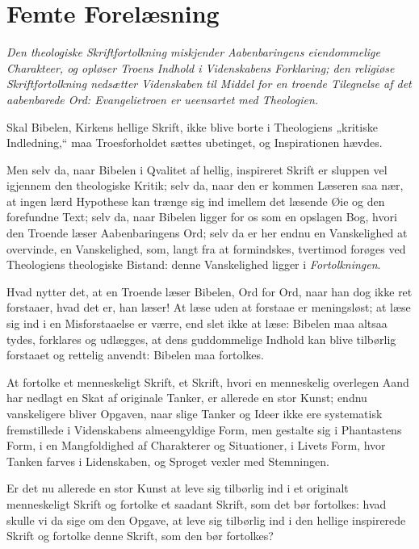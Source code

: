\documentclass[12pt,a4paper]{book}
\newcommand{\opage}[1]{\marginnote{\footnotesize\textit{[#1]}}}
\begin{document}
\chapter*{Femte Forelæsning}
\label{ch:forel5}

\begin{center}\itshape
Den theologiske Skriftfortolkning miskjender Aabenbaringens eiendommelige
Charakteer, og opløser Troens Indhold i Videnskabens Forklaring; den
religiøse Skriftfortolkning nedsætter Videnskaben til Middel for en
troende Tilegnelse af det aabenbarede Ord: Evangelietroen er ueensartet
med Theologien.
\end{center}

\opage{52} Skal Bibelen, Kirkens hellige Skrift, ikke blive borte i Theologiens
„kritiske Indledning,“ maa Troesforholdet sættes ubetinget, og
Inspirationen hævdes.

Men selv da, naar Bibelen i Qvalitet af hellig, inspireret Skrift er
sluppen vel igjennem den theologiske Kritik; selv da, naar den er kommen
Læseren saa nær, at ingen lærd Hypothese kan trænge sig ind imellem det
læsende Øie og den forefundne Text; selv da, naar Bibelen ligger for os
som en opslagen Bog, hvori den Troende læser Aabenbaringens Ord; selv da
er her endnu en Vanskelighed at overvinde, en Vanskelighed, som, langt
fra at formindskes, tvertimod forøges ved Theologiens theologiske
Bistand: denne Vanskelighed ligger i \emph{Fortolkningen}.

Hvad nytter det, at en Troende læser Bibelen, Ord for Ord, naar han dog
ikke ret forstaaer, hvad det er, han læser! At læse uden at forstaae er
meningsløst; at læse sig ind i en Misforstaaelse er værre, end slet ikke
at læse: Bibelen maa altsaa tydes, forklares og udlægges, at dens
guddommelige Indhold
\opage{53} kan blive tilbørlig forstaaet og rettelig anvendt: Bibelen maa fortolkes.

At fortolke et menneskeligt Skrift, et Skrift, hvori en menneskelig
overlegen Aand har nedlagt en Skat af originale Tanker, er allerede en
stor Kunst; endnu vanskeligere bliver Opgaven, naar slige Tanker og Ideer
ikke ere systematisk fremstillede i Videnskabens almeengyldige Form, men
gestalte sig i Phantastens Form, i en Mangfoldighed af Charakterer og
Situationer, i Livets Form, hvor Tanken farves i Lidenskaben, og Sproget
vexler med Stemningen.

Er det nu allerede en stor Kunst at leve sig tilbørlig ind i et originalt
menneskeligt Skrift og fortolke et saadant Skrift, som det bør fortolkes:
hvad skulle vi da sige om den Opgave, at leve sig tilbørlig ind i den
hellige inspirerede Skrift og fortolke denne Skrift, som den bør
fortolkes?
\end{document}
